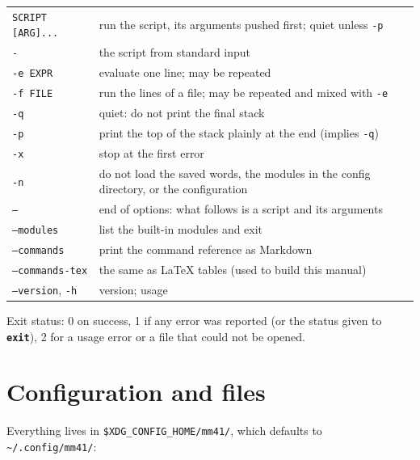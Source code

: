 \documentclass[11pt,letterpaper]{article}
\newcommand{\code}[1]{\texttt{#1}}
\newcommand{\cmd}[1]{\texttt{\textbf{#1}}}
\begin{document}
\begin{center}
\begin{tabular}{@{}lp{}@{}}
\toprule
\code{SCRIPT [ARG]...} & run the script, its arguments pushed first; quiet unless \code{-p} \\
\code{-}       & the script from standard input \\
\code{-e EXPR} & evaluate one line; may be repeated \\
\code{-f FILE} & run the lines of a file; may be repeated and mixed with \code{-e} \\
\code{-q}      & quiet: do not print the final stack \\
\code{-p}      & print the top of the stack plainly at the end (implies \code{-q}) \\
\code{-x}      & stop at the first error \\
\code{-n}      & do not load the saved words, the modules in the config directory, or the configuration \\
\code{--}      & end of options: what follows is a script and its arguments \\
\code{--modules} & list the built-in modules and exit \\
\code{--commands} & print the command reference as Markdown \\
\code{--commands-tex} & the same as LaTeX tables (used to build this manual) \\
\code{--version}, \code{-h} & version; usage \\
\bottomrule
\end{tabular}
\end{center}
Exit status: 0 on success, 1 if any error was reported (or the status given to \cmd{exit}), 2 for a usage error or a file that could not be opened.

\section{Configuration and files}

Everything lives in \code{\$XDG\_CONFIG\_HOME/mm41/}, which defaults to \code{\textasciitilde/.config/mm41/}:
\end{document}

